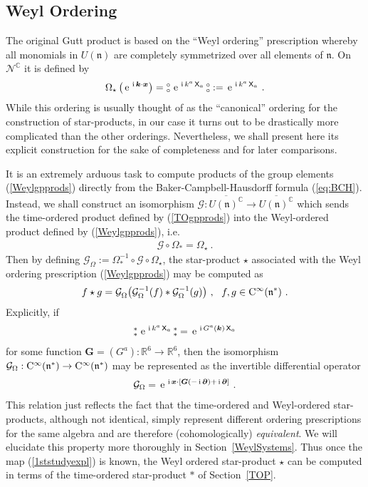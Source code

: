 \documentclass[11pt,a4paper]{article}
\newcommand{\NO}{\mbox{$\substack{\circ\\\circ}$}}      %
\newcommand{\NOa}{\mbox{$\substack{\ast\\\ast}$}}       %
\newcommand{\mbf}[1]{{\boldsymbol {#1} }}
\def\ii{{\,{\rm i}\,}}
\def\CC{{\rm C}}
\def\X{{\sf X}}
\def\mx{{\mbf x}}
\def\mk{{\mbf k}}
\def\mG{{\mbf G}}
\def\mfn{{\mathfrak n}}
\newcommand{\complex}{{\mathbb C}} %
\newcommand{\real}{{\mathbb R}} %
\def\e{{\,\rm e}\,}
\newcommand{\beq}{\begin{eqnarray}}
\newcommand{\eeq}{\end{eqnarray}}
\begin{document}
\subsection{Weyl Ordering\label{WOP}}

The original Gutt product is based on the ``Weyl ordering''
prescription whereby all monomials  in $U(\mfn)$ are completely
symmetrized over all elements of $\mfn$. On
$\mathcal{N}^\complex$ it is defined by
\beq
\Omega_\star\left(\e^{\ii\mk\cdot\mx}\right)=
\NO\,\e^{\ii k^a\,\X_a}\,\NO:=\e^{\ii k^a\,\X_a} \ .
\label{Weylgpprods}\eeq
While this ordering is usually thought of as the ``canonical''
ordering for the construction of star-products, in our case it turns
out to be drastically more complicated than the other
orderings. Nevertheless, we shall present here its explicit
construction for the sake of completeness and for later comparisons.

It is an extremely arduous task to compute products of the group
elements (\ref{Weylgpprods}) directly from the
Baker-Campbell-Hausdorff formula (\ref{eq:BCH}). Instead, we shall
construct an isomorphism $\mathcal{G}:\overline{U(\mfn)^\complex}\to
\overline{U(\mfn)^\complex}$ which sends the time-ordered product defined by
(\ref{TOgpprods}) into the Weyl-ordered product defined by
(\ref{Weylgpprods}), i.e.
\beq
\mathcal{G}\circ\Omega_*=\Omega_\star \ .
\label{1ststudy}\eeq
Then by defining
$\mathcal{G}_\Omega:=\Omega_*^{-1}\circ\mathcal{G}\circ\Omega^{~}_\star$,
the star-product $\star$ associated with the Weyl ordering
prescription (\ref{Weylgpprods}) may be computed as
\beq
f\star g=\mathcal{G}^{~}_\Omega\bigl(\mathcal{G}_\Omega^{-1}(f)*
\mathcal{G}_\Omega^{-1}(g)\bigr) \ , ~~ f,g\in\CC^\infty(\mfn^*) \ .
\label{WeylTOrel}\eeq
Explicitly, if
\beq
\NOa\,\e^{\ii k^a\,\X_a}\,\NOa=\e^{\ii G^a(\mk)\,\X_a}
\label{1ststudyexpl}\eeq
for some function $\mG=(G^a):\real^6\to\real^6$, then the isomorphism
$\mathcal{G}_\Omega:\CC^\infty(\mfn^*)\to\CC^\infty(\mfn^*)$ may
be represented as the invertible differential operator
\beq
\mathcal{G}_\Omega=\e^{\ii\mx\cdot[\mG(-\ii\mbf\partial)+\ii\mbf
\partial]} \ .
\label{Gdiffop}\eeq
This relation just reflects the fact that the time-ordered and
Weyl-ordered star-products, although not identical, simply represent
different ordering prescriptions for the same algebra and are
therefore (cohomologically) {\it
  equivalent}. We will elucidate this property more thoroughly in
Section~\ref{WeylSystems}. Thus once the map (\ref{1ststudyexpl}) is
known, the Weyl ordered star-product $\star$ can be computed in terms
of the time-ordered star-product $*$ of Section~\ref{TOP}.
\end{document}
